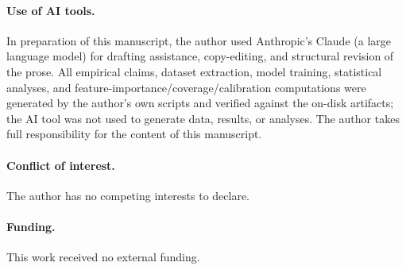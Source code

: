 \documentclass[11pt,a4paper]{article}
\begin{document}
\paragraph{Use of AI tools.} In preparation of this manuscript, the author used Anthropic's Claude (a large language model) for drafting assistance, copy-editing, and structural revision of the prose. All empirical claims, dataset extraction, model training, statistical analyses, and feature-importance/coverage/calibration computations were generated by the author's own scripts and verified against the on-disk artifacts; the AI tool was not used to generate data, results, or analyses. The author takes full responsibility for the content of this manuscript.

\paragraph{Conflict of interest.} The author has no competing interests to declare.

\paragraph{Funding.} This work received no external funding.



\end{document}
